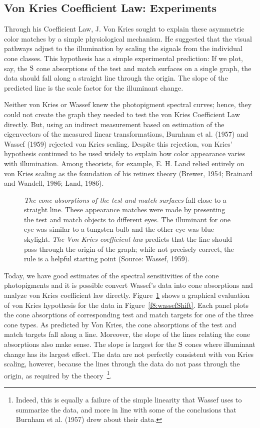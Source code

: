 \subsection*{Von Kries Coefficient Law:  Experiments}

Through his Coefficient Law, J. Von Kries sought to explain these
asymmetric color matches by a simple physiological mechanism.  He
suggested that the visual pathways adjust to the illumination by
scaling the signals from the individual cone classes.  This
hypothesis has a simple experimental prediction: If we plot, say, the
$\mbox{S}$ cone absorptions of the test and match surfaces on a single
graph, the data should fall along a straight line through the origin.
The slope of the predicted line is the scale factor for the
illuminant change.

Neither von Kries or Wassef knew the photopigment spectral curves;
hence, they could not create the graph they needed to test the von
Kries Coefficient Law directly.  But, using an indirect measurement
based on estimation of the eigenvectors of the measured linear
transformations, Burnham et al. (1957) and Wassef (1959) rejected von
Kries scaling.  Despite this rejection, von Kries' hypothesis
continued to be used widely to explain how color appearance varies
with illumination.  Among theorists, for example, E. H. Land relied
entirely on von Kries scaling as the foundation of his retinex theory
(Brewer, 1954; Brainard and Wandell, 1986; Land, 1986).

\begin{figure}
\centerline{
}
\caption[Wassef-von Kries]{
{\em The cone absorptions of the test and match surfaces} fall close
to a straight line.  These appearance matches were made by presenting
the test and match objects to different eyes.  The illuminant for one
eye was similar to a tungsten bulb and the other eye was blue
skylight.  {\em The Von Kries coefficient law} predicts that the line
should pass through the origin of the graph; while not precisely
correct, the rule is a helpful starting point (Source: Wassef, 1959).
}
\label{f8:wassefVK}
\end{figure}
Today, we have good estimates of the spectral sensitivities of the
cone photopigments and it is possible convert Wassef's data into cone
absorptions and analyze von Kries coefficient law directly.
Figure~\ref{f8:wassefVK} shows a graphical evaluation of von Kries
hypothesis for the data in Figure~\ref{f8:wassefShift}.  Each panel
plots the cone absorptions of corresponding test and match targets for
one of the three cone types.  As predicted by Von Kries, the cone
absorptions of the test and match targets fall along a line.
Moreover, the slope of the lines relating the cone absorptions also
make sense.  The slope is largest for the $\mbox{S}$ cones where
illuminant change has its largest effect.  The data are not perfectly
consistent with von Kries scaling, however, because the lines through
the data do not pass through the origin, as required by the
theory~\footnote{Indeed, this is equally a failure of the simple
linearity that Wassef uses to summarize the data, and more in line
with some of the conclusions that Burnham et al. (1957) drew about their
data.}.


